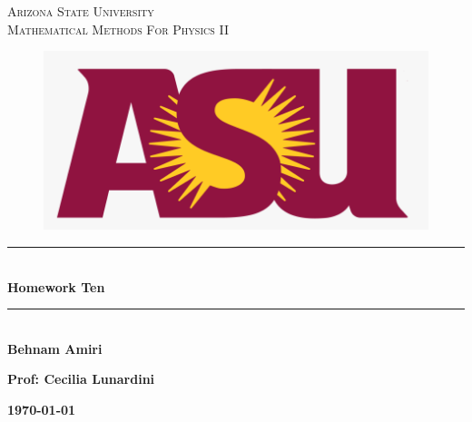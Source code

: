 \documentclass[fleqn]{article}
\begin{document}
  \begin{titlepage}

    \newcommand{\HRule}{\rule{\linewidth}{0.5mm}} %

    \center %



    \textsc{\LARGE Arizona State University}\\[1.5cm] %

    \textsc{\LARGE Mathematical Methods For Physics II }\\[1.5cm] %


    \begin{figure}
      \includegraphics[width=\linewidth]{asu.png}
    \end{figure}


    \HRule \\[0.4cm]
    { \huge \bfseries Homework Ten}\\[0.4cm] 
    \HRule \\[1.5cm]

    \textbf{Behnam Amiri}

    \bigbreak

    \textbf{Prof: Cecilia Lunardini}

    \bigbreak


    \textbf{{\large \today}\\[2cm]}

    \vfill %

  \end{titlepage}
\end{document}
